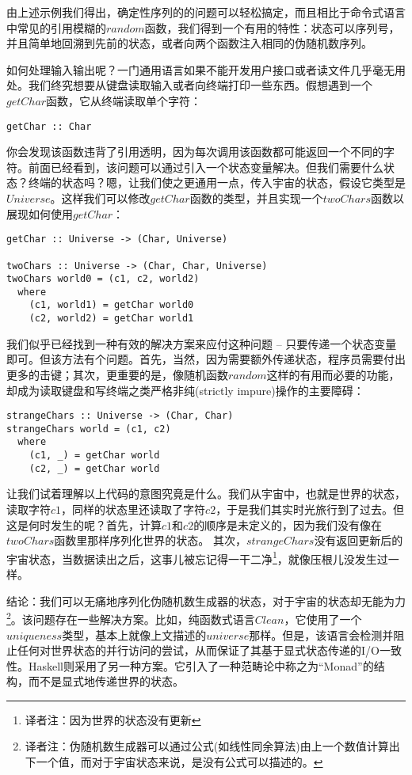 由上述示例我们得出，确定性序列的的问题可以轻松搞定，而且相比于命令式语言中常见的引用模糊的$random$函数，我们得到一个有用的特性：状态可以序列号，并且简单地回溯到先前的状态，或者向两个函数注入相同的伪随机数序列。

如何处理输入输出呢？一门通用语言如果不能开发用户接口或者读文件几乎毫无用处。我们终究想要从键盘读取输入或者向终端打印一些东西。假想遇到一个$getChar$函数，它从终端读取单个字符：

\begin{lstlisting}
getChar :: Char
\end{lstlisting}

你会发现该函数违背了引用透明，因为每次调用该函数都可能返回一个不同的字符。前面已经看到，该问题可以通过引入一个状态变量解决。但我们需要什么状态？终端的状态吗？嗯，让我们使之更通用一点，传入宇宙的状态，假设它类型是$Universe$。这样我们可以修改$getChar$函数的类型，并且实现一个$twoChars$函数以展现如何使用$getChar$：

\begin{lstlisting}
getChar :: Universe -> (Char, Universe)

twoChars :: Universe -> (Char, Char, Universe)
twoChars world0 = (c1, c2, world2)
  where
    (c1, world1) = getChar world0
    (c2, world2) = getChar world1
\end{lstlisting}

我们似乎已经找到一种有效的解决方案来应付这种问题 -- 只要传递一个状态变量即可。但该方法有个问题。首先，当然，因为需要额外传递状态，程序员需要付出更多的击键；其次，更重要的是，像随机函数$random$这样的有用而必要的功能，却成为读取键盘和写终端之类严格非纯(strictly impure)操作的主要障碍：

\begin{lstlisting}
strangeChars :: Universe -> (Char, Char)
strangeChars world = (c1, c2)
  where
    (c1, _) = getChar world
    (c2, _) = getChar world
\end{lstlisting}

让我们试着理解以上代码的意图究竟是什么。我们从宇宙中，也就是世界的状态， 读取字符$c1$，同样的状态里还读取了字符$c2$，于是我们其实时光旅行到了过去。但这是何时发生的呢？首先，计算$c1$和$c2$的顺序是未定义的，因为我们没有像在$twoChars$函数里那样序列化世界的状态。 其次，$strangeChars$没有返回更新后的宇宙状态，当数据读出之后，这事儿被忘记得一干二净\footnote{译者注：因为世界的状态没有更新}，就像压根儿没发生过一样。

结论：我们可以无痛地序列化伪随机数生成器的状态，对于宇宙的状态却无能为力\footnote{译者注：伪随机数生成器可以通过公式(如线性同余算法)由上一个数值计算出下一个值，而对于宇宙状态来说，是没有公式可以描述的。}。该问题存在一些解决方案。比如，纯函数式语言$Clean$，它使用了一个$uniqueness$类型，基本上就像上文描述的$universe$那样。但是，该语言会检测并阻止任何对世界状态的并行访问的尝试，从而保证了其基于显式状态传递的I/O一致性。Haskell则采用了另一种方案。它引入了一种范畴论中称之为``Monad''的结构，而不是显式地传递世界的状态。